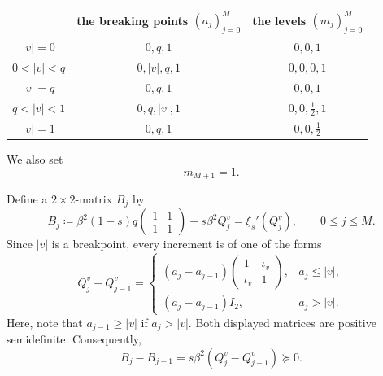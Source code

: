 \documentclass[11pt]{article}
\numberwithin{equation}{section}
\newcommand{\1}{\mathbf 1}
\begin{document}
\begin{center}
\begin{tabular}{|c||c|c|}
\hline
& the breaking points $(a_j)_{j=0}^M$ & the levels $(m_j)_{j=0}^{M}$ \\[1mm]
\hline
$|v|=0$ & $0,q,1$ & $0,0,1$\\[1mm]
\hline
$0<|v|<q$ & $0,|v|,q,1$ & $0,0,0,1$ \\[1mm]
\hline
$|v|=q$ & $0,q,1$ & $0,0,1$ \\[1mm]
\hline 
$q<|v|<1$ & $0,q,|v|,1$ & $0,0,\frac12,1$ \\[1mm]
\hline
$|v|=1$ & $0,q,1$ & $0,0,\frac12$\\[1mm]
\hline
\end{tabular}
\end{center}
%
We also set
\[
m_{M+1}=1.
\]


Define a $2\times 2$-matrix $B_j$ by
\begin{equation}\label{eq:defB}
 B_j\coloneqq\beta^2(1-s)q
 \begin{pmatrix}1&1\\1&1\end{pmatrix}
 +s\beta^2Q_j^v
 =\xi_s'(Q_j^v),
 \qquad 0\le j\le M.
\end{equation}
Since $|v|$ is a breakpoint, every increment is of one of the forms
\begin{equation}
 Q_j^v-Q_{j-1}^v=
 \begin{cases}
 (a_j-a_{j-1})
 \begin{pmatrix}1&\iota_v\\\iota_v&1\end{pmatrix},&a_j\le |v|,\\[3mm]
 (a_j-a_{j-1})I_2,&a_{j}> |v|.
 \end{cases}
 \label{eq:GT-overlap-increments}
\end{equation}
Here, note that $a_{j-1} \geq |v|$ if $a_j >|v|$.
Both displayed matrices are positive semidefinite.  Consequently,
\begin{equation}\label{eq:finite-step-vector-increments}
 B_j-B_{j-1}=s\beta^2(Q_j^v-Q_{j-1}^v)\succeq0.
\end{equation}
\end{document}
